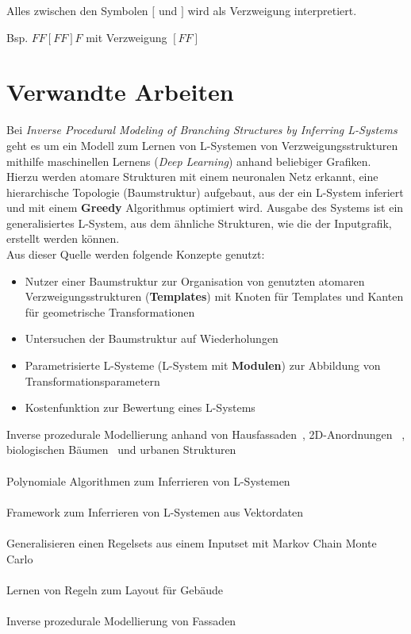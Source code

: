 \newpage
Alles zwischen den Symbolen $[$ und $]$ wird als Verzweigung interpretiert.
\begin{center}
    Bsp. $FF[FF]F$ mit Verzweigung $[FF]$
\end{center}

\section{Verwandte Arbeiten}

Bei \textit{Inverse Procedural Modeling of Branching Structures by Inferring L-Systems}\cite{guo_2020} geht es um ein
Modell zum Lernen von L-Systemen von Verzweigungsstrukturen mithilfe maschinellen Lernens (\textit{Deep
Learning}) anhand beliebiger Grafiken.
Hierzu werden atomare Strukturen mit einem neuronalen Netz erkannt, eine hierarchische Topologie (Baumstruktur)
aufgebaut, aus der ein L-System inferiert und mit einem \textbf{Greedy} Algorithmus optimiert wird.
Ausgabe des Systems ist ein generalisiertes L-System, aus dem ähnliche Strukturen, wie die der Inputgrafik,
erstellt werden können.\\
Aus dieser Quelle werden folgende Konzepte genutzt:
\begin{itemize}
    \item Nutzer einer Baumstruktur zur Organisation von genutzten atomaren Verzweigungsstrukturen
    (\textbf{Templates}) mit Knoten für Templates und Kanten für geometrische Transformationen
    \item Untersuchen der Baumstruktur auf Wiederholungen
    \item Parametrisierte L-Systeme (L-System mit \textbf{Modulen}) zur Abbildung von Transformationsparametern
    \item Kostenfunktion zur Bewertung eines L-Systems
\end{itemize}

Inverse prozedurale Modellierung anhand von Hausfassaden~\cite{martinovic_2013}, 2D-Anordnungen
~\cite{ellis_2018,stava_2010}, biologischen Bäumen~\cite{stava_2014} und urbanen Strukturen~\cite{nishida_2016}
\\~\\
Polynomiale Algorithmen zum Inferrieren von L-Systemen~\cite{mcquillan_2018}
\\~\\
Framework zum Inferrieren von L-Systemen aus Vektordaten~\cite{stava_2010}
\\~\\
Generalisieren einen Regelsets aus einem Inputset mit Markov Chain Monte Carlo~\cite{talton_2012, talton_2011}
\\~\\
Lernen von Regeln zum Layout für Gebäude~\cite{martinovic_2013}
\\~\\
Inverse prozedurale Modellierung von Fassaden~\cite{xiao_2008}